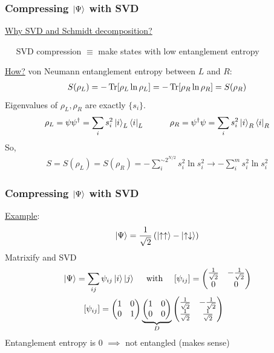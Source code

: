 \documentclass{beamer}
\theoremstyle{definition}
\newcommand{\lp}{\left(}
\newcommand{\rp}{\right)}
\newcommand{\f}[2]{\frac{#1}{#2}}
\begin{document}
\begin{frame}
	\frametitle{Compressing $\ket{\Psi}$ with SVD}
	
	\underline{Why SVD and Schmidt decomposition?} \\
	
	\vspace{8pt}
	
	$\quad$ SVD compression $\equiv$ make states with low entanglement entropy\\
	
	
	\vspace{8pt} \pause
	
	\underline{How?} von Neumann entanglement entropy between $L$ and $R$:
	\begin{align*}
		S(\rho_L) = -\Tr[\rho_L \ln \rho_L] = -\Tr[\rho_R \ln \rho_R] = S(\rho_R) 
	\end{align*}
\pause
	Eigenvalues of $\rho_L, \rho_R$ are exactly $\{s_i\}$.
	\begin{align*}
		\rho_L = \psi\psi^\dagger = \sum_i s_i^2 \ket{i}_L \bra{i}_L \quad\quad\quad \rho_R = \psi^\dagger\psi = \sum_i s_i^2 \ket{i}_R \bra{i}_R
	\end{align*}
So, \vspace{-30pt}
	\begin{align*}
		S = S(\rho_L) = S(\rho_R) = -\sum_i^{\sim 2^{N/2}} s_i^2 \ln s_i^2 \to -\sum_i^m s_i^2 \ln s_i^2
	\end{align*}
	
\end{frame}


\begin{frame}
	\frametitle{Compressing $\ket{\Psi}$ with SVD}
	
	\underline{Example}:  
	\begin{align*}
		\ket{\Psi} = \f{1}{\sqrt{2}}\lp \ket{\uparrow\uparrow} - \ket{\uparrow\downarrow} \rp
	\end{align*}
	Matrixify and SVD
	\begin{align*}
		&\ket{\Psi} = \sum_{ij}\psi_{ij}\ket{i}\ket{j} \quad \text{ with } \quad   [\psi_{ij}] = \begin{pmatrix}
			\f{1}{\sqrt{2}} & -\f{1}{\sqrt{2}} \\ 0 & 0
		\end{pmatrix}\\
		&\quad\quad \,\,\,[\psi_{ij}] = \begin{pmatrix}
			1 & 0 \\ 0 & 1
		\end{pmatrix}
		\underbrace{\begin{pmatrix}
				1 & 0 \\ 0 & 0 
		\end{pmatrix}}_D
		\begin{pmatrix}
			\f{1}{\sqrt{2}} & -\f{1}{\sqrt{2}} \\ 	\f{1}{\sqrt{2}} & \f{1}{\sqrt{2}}
		\end{pmatrix}
	\end{align*}
	\pause Entanglement entropy is 0 $\implies$ not entangled (makes sense)
\end{frame}
\end{document}

